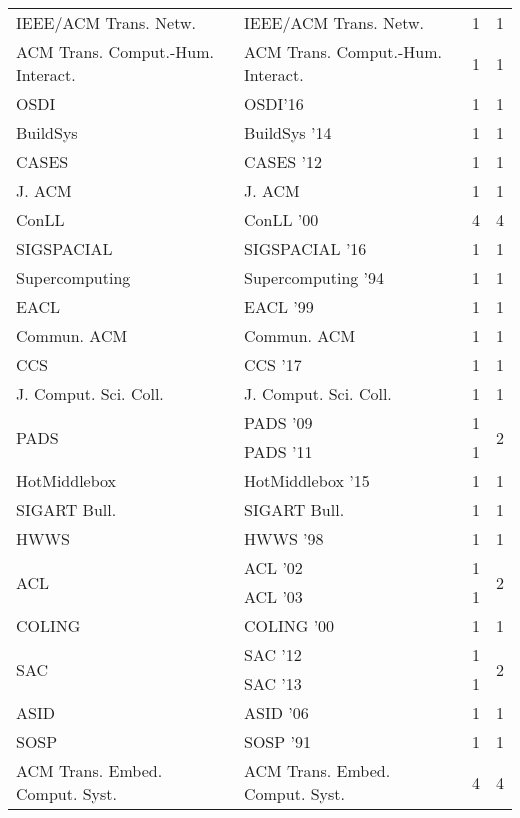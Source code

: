 \begin{table*}[t]
\begin{tabular}{llrr}
\multirow{1}{*}{IEEE/ACM Trans. Netw.} & IEEE/ACM Trans. Netw. & 1 & \multirow{1}{*}{1}\\
\multirow{1}{*}{ACM Trans. Comput.-Hum. Interact.} & ACM Trans. Comput.-Hum. Interact. & 1 & \multirow{1}{*}{1}\\
\multirow{1}{*}{OSDI} & OSDI'16 & 1 & \multirow{1}{*}{1}\\
\multirow{1}{*}{BuildSys } & BuildSys '14 & 1 & \multirow{1}{*}{1}\\
\multirow{1}{*}{CASES } & CASES '12 & 1 & \multirow{1}{*}{1}\\
\multirow{1}{*}{J. ACM} & J. ACM & 1 & \multirow{1}{*}{1}\\
\multirow{1}{*}{ConLL } & ConLL '00 & 4 & \multirow{1}{*}{4}\\
\multirow{1}{*}{SIGSPACIAL } & SIGSPACIAL '16 & 1 & \multirow{1}{*}{1}\\
\multirow{1}{*}{Supercomputing } & Supercomputing '94 & 1 & \multirow{1}{*}{1}\\
\multirow{1}{*}{EACL } & EACL '99 & 1 & \multirow{1}{*}{1}\\
\multirow{1}{*}{Commun. ACM} & Commun. ACM & 1 & \multirow{1}{*}{1}\\
\multirow{1}{*}{CCS } & CCS '17 & 1 & \multirow{1}{*}{1}\\
\multirow{1}{*}{J. Comput. Sci. Coll.} & J. Comput. Sci. Coll. & 1 & \multirow{1}{*}{1}\\
\multirow{2}{*}{PADS } & PADS '09 & 1 & \multirow{2}{*}{2}\\
& PADS '11 & 1 &\\
\multirow{1}{*}{HotMiddlebox } & HotMiddlebox '15 & 1 & \multirow{1}{*}{1}\\
\multirow{1}{*}{SIGART Bull.} & SIGART Bull. & 1 & \multirow{1}{*}{1}\\
\multirow{1}{*}{HWWS } & HWWS '98 & 1 & \multirow{1}{*}{1}\\
\multirow{2}{*}{ACL } & ACL '02 & 1 & \multirow{2}{*}{2}\\
& ACL '03 & 1 &\\
\multirow{1}{*}{COLING } & COLING '00 & 1 & \multirow{1}{*}{1}\\
\multirow{2}{*}{SAC } & SAC '12 & 1 & \multirow{2}{*}{2}\\
& SAC '13 & 1 &\\
\multirow{1}{*}{ASID } & ASID '06 & 1 & \multirow{1}{*}{1}\\
\multirow{1}{*}{SOSP } & SOSP '91 & 1 & \multirow{1}{*}{1}\\
\multirow{1}{*}{ACM Trans. Embed. Comput. Syst.} & ACM Trans. Embed. Comput. Syst. & 4 & \multirow{1}{*}{4}\\

\end{tabular}
\end{table*}
